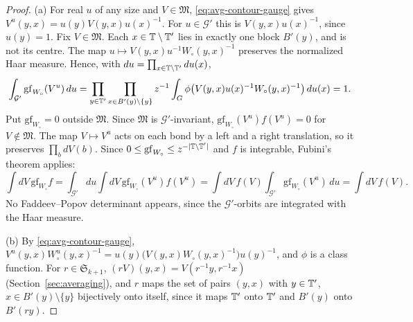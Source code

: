 \begin{proof}
(a) For real $u$ of any size and $V\in\mathfrak M$, \eqref{eq:avg-contour-gauge} gives $V^u(y,x)=u(y)V(y,x)u(x)^{-1}$. For $u\in\mathcal G'$ this is $V(y,x)u(x)^{-1}$, since $u(y)=1$. Fix $V\in\mathfrak M$. Each $x\in\mathbb T\setminus\mathbb T'$ lies in exactly one block $B'(y)$, and is not its centre. The map $u\mapsto V(y,x)u^{-1}W_\circ(y,x)^{-1}$ preserves the normalized Haar measure. Hence, with $du=\prod_{x\in\mathbb T\setminus\mathbb T'}du(x)$,
\[
\int_{\mathcal G'}\mathrm{gf}_{W_\circ}(V^u)\,du=\prod_{y\in\mathbb T'}\prod_{x\in B'(y)\setminus\{y\}}z^{-1}\int_G\phi\big(V(y,x)u(x)^{-1}W_\circ(y,x)^{-1}\big)\,du(x)=1 .
\]
Put $\mathrm{gf}_{W_\circ}=0$ outside $\mathfrak M$. Since $\mathfrak M$ is $\mathcal G'$-invariant, $\mathrm{gf}_{W_\circ}(V^u)f(V^u)=0$ for $V\notin\mathfrak M$. The map $V\mapsto V^u$ acts on each bond by a left and a right translation, so it preserves $\prod_bdV(b)$. Since $0\le\mathrm{gf}_{W_\circ}\le z^{-|\mathbb T\setminus\mathbb T'|}$ and $f$ is integrable, Fubini's theorem applies:
\[
\int dV\,\mathrm{gf}_{W_\circ}f=\int_{\mathcal G'}du\int dV\,\mathrm{gf}_{W_\circ}(V^u)f(V^u)=\int dV\,f(V)\int_{\mathcal G'}\mathrm{gf}_{W_\circ}(V^u)\,du=\int dV\,f(V).
\]
No Faddeev--Popov determinant appears, since the $\mathcal G'$-orbits are integrated with the Haar measure.

(b) By \eqref{eq:avg-contour-gauge}, $V^u(y,x)W_\circ^u(y,x)^{-1}=u(y)\big(V(y,x)W_\circ(y,x)^{-1}\big)u(y)^{-1}$, and $\phi$ is a class function. For $r\in\mathfrak S_{k+1}$, $(rV)(y,x)=V(r^{-1}y,r^{-1}x)$ (Section~\ref{sec:averaging}), and $r$ maps the set of pairs $(y,x)$ with $y\in\mathbb T'$, $x\in B'(y)\setminus\{y\}$ bijectively onto itself, since it maps $\mathbb T'$ onto $\mathbb T'$ and $B'(y)$ onto $B'(ry)$.


\end{proof}
